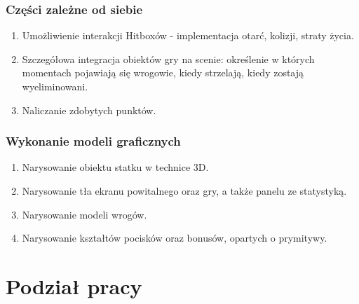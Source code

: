 \documentclass[a4paper,twoside]{article}
\begin{document}
	\section{Części zależne od siebie}
	\begin{enumerate}[label=\alph*.]
		\item Umożliwienie interakcji Hitboxów - implementacja otarć, kolizji, straty życia.
		\item Szczegółowa integracja obiektów gry na scenie: określenie w których momentach pojawiają się wrogowie, kiedy strzelają, kiedy zostają wyeliminowani.
		\item Naliczanie zdobytych punktów.
	\end{enumerate}
	\section{Wykonanie modeli graficznych}
	\begin{enumerate}[label=\alph*.]
		\item Narysowanie obiektu statku w technice 3D.
		\item Narysowanie tła ekranu powitalnego oraz gry, a także panelu ze statystyką.
		\item Narysowanie modeli wrogów.
		\item Narysowanie kształtów pocisków oraz bonusów, opartych o prymitywy.
	\end{enumerate}
	
	
	\newpage
	
	\part{Podział pracy}
	
\end{document}
